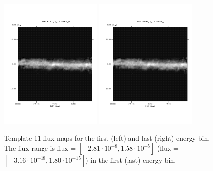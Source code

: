 \documentclass{article}
\begin{document}
\begin{figure}
\centering
\includegraphics[trim = 50 100 70 100, clip = true, width=0.45\textwidth]{figs/Template_maps/Template11_Ebin01}
\includegraphics[trim = 50 100 70 100, clip = true, width=0.45\textwidth]{figs/Template_maps/Template11_Ebin71}
\caption{Template 11 flux maps for the first (left) and last (right) energy bin. The flux range is flux = $[-2.81 \cdot 10^{-8}, 1.58 \cdot 10^{-5}]$ (flux = $[-3.16 \cdot 10^{-18}, 1.80 \cdot 10^{-15}]$) in the first (last) energy bin.}
\end{figure}
\end{document}
